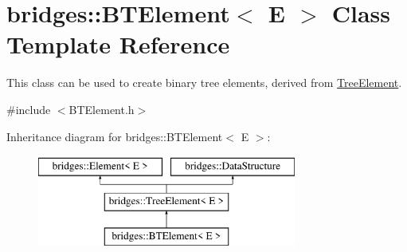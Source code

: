 \hypertarget{classbridges_1_1_b_t_element}{}\section{bridges\+:\+:B\+T\+Element$<$ E $>$ Class Template Reference}
\label{classbridges_1_1_b_t_element}


This class can be used to create binary tree elements, derived from \mbox{\hyperlink{classbridges_1_1_tree_element}{Tree\+Element}}.  




{\ttfamily \#include $<$B\+T\+Element.\+h$>$}

Inheritance diagram for bridges\+:\+:B\+T\+Element$<$ E $>$\+:\begin{figure}[H]
\begin{center}
\leavevmode
\includegraphics[height=3.000000cm]{classbridges_1_1_b_t_element}
\end{center}
\end{figure}
